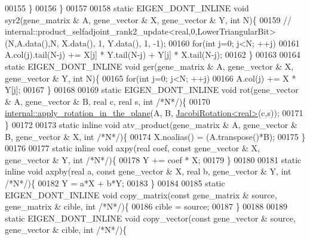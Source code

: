 \begin{DoxyCode}
00155     \}
00156   \}
00157 
00158   \textcolor{keyword}{static} EIGEN\_DONT\_INLINE \textcolor{keywordtype}{void} syr2(gene\_matrix & A,  gene\_vector & X, gene\_vector & Y, \textcolor{keywordtype}{int}  N)\{
00159     \textcolor{comment}{// internal::product\_selfadjoint\_rank2\_update<real,0,LowerTriangularBit>(N,A.data(),N, X.data(), 1,
       Y.data(), 1, -1);}
00160     \textcolor{keywordflow}{for}(\textcolor{keywordtype}{int} j=0; j<N; ++j)
00161       A.col(j).tail(N-j) += X[j] * Y.tail(N-j) + Y[j] * X.tail(N-j);
00162   \}
00163 
00164   \textcolor{keyword}{static} EIGEN\_DONT\_INLINE \textcolor{keywordtype}{void} ger(gene\_matrix & A,  gene\_vector & X, gene\_vector & Y, \textcolor{keywordtype}{int}  N)\{
00165     \textcolor{keywordflow}{for}(\textcolor{keywordtype}{int} j=0; j<N; ++j)
00166       A.col(j) += X * Y[j];
00167   \}
00168 
00169   \textcolor{keyword}{static} EIGEN\_DONT\_INLINE \textcolor{keywordtype}{void} rot(gene\_vector & A,  gene\_vector & B, real c, real s, \textcolor{keywordtype}{int}  \textcolor{comment}{/*N*/})\{
00170     \hyperlink{namespace_eigen_1_1internal_a5f7738a5c56c9b9decf94d9728ba7906}{internal::apply\_rotation\_in\_the\_plane}(A, B, 
      \hyperlink{group___jacobi___module_class_eigen_1_1_jacobi_rotation}{JacobiRotation<real>}(c,s));
00171   \}
00172 
00173   \textcolor{keyword}{static} \textcolor{keyword}{inline} \textcolor{keywordtype}{void} atv\_product(gene\_matrix & A, gene\_vector & B, gene\_vector & X, \textcolor{keywordtype}{int}  \textcolor{comment}{/*N*/})\{
00174     X.noalias() = (A.transpose()*B);
00175   \}
00176 
00177   \textcolor{keyword}{static} \textcolor{keyword}{inline} \textcolor{keywordtype}{void} axpy(real coef, \textcolor{keyword}{const} gene\_vector & X, gene\_vector & Y, \textcolor{keywordtype}{int}  \textcolor{comment}{/*N*/})\{
00178     Y += coef * X;
00179   \}
00180 
00181   \textcolor{keyword}{static} \textcolor{keyword}{inline} \textcolor{keywordtype}{void} axpby(real a, \textcolor{keyword}{const} gene\_vector & X, real b, gene\_vector & Y, \textcolor{keywordtype}{int}  \textcolor{comment}{/*N*/})\{
00182     Y = a*X + b*Y;
00183   \}
00184 
00185   \textcolor{keyword}{static} EIGEN\_DONT\_INLINE \textcolor{keywordtype}{void} copy\_matrix(\textcolor{keyword}{const} gene\_matrix & source, gene\_matrix & cible, \textcolor{keywordtype}{int}  \textcolor{comment}{/*N*/})\{
00186     cible = source;
00187   \}
00188 
00189   \textcolor{keyword}{static} EIGEN\_DONT\_INLINE \textcolor{keywordtype}{void} copy\_vector(\textcolor{keyword}{const} gene\_vector & source, gene\_vector & cible, \textcolor{keywordtype}{int}  \textcolor{comment}{/*N*/})\{

\end{DoxyCode}
